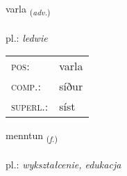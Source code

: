\documentclass[frontgrid, backgrid]{flacards}\usepackage[]{graphicx}\usepackage[]{xcolor}
\begin{document}
\renewcommand{\flhead}{\vskip5pt \fboxsep=0pt {\small\bfseries\footnotesize Atviksorð | Adverb}}
\renewcommand{\fcfoot}{\vskip5pt \fboxsep=0pt \hspace{2pt}{\small\bfseries\footnotesize 1K}}

\renewcommand{\blhead}{\vskip5pt {\small\bfseries\footnotesize Atviksorð | Adverb }}
\renewcommand{\bcfoot}{\vskip5pt \hspace{2pt}{\small\bfseries\footnotesize 1K}}


{varla \small{\textsubscript{(\textit{adv.})}} \\[1ex] %
\textphonetic{[vartla]} \\
pl.: \emph{ledwie} \\  [2ex]
\renewcommand*{\arraystretch}{0.8}
\begin{tabular}{ll}
\textsc{pos}: & varla \\ 
\textsc{comp.}: & síður \\ 
\textsc{superl.}: & síst \\
\end{tabular}
}

\renewcommand{\flhead}{\vskip5pt \fboxsep=0pt {\small\bfseries\footnotesize Nafnorð | Noun}}
\renewcommand{\fcfoot}{\vskip5pt \fboxsep=0pt \hspace{2pt}{\small\bfseries\footnotesize 1K}}

\renewcommand{\blhead}{\vskip5pt {\small\bfseries\footnotesize Nafnorð | Noun }}
\renewcommand{\bcfoot}{\vskip5pt \hspace{2pt}{\small\bfseries\footnotesize 1K}}


{menntun \small{\textsubscript{(\textit{f.})}} \\[1ex] %
 \\
pl.: \emph{wykształcenie, edukacja} \\  [2ex]
\renewcommand*{\arraystretch}{0.8}
}
\end{document}

